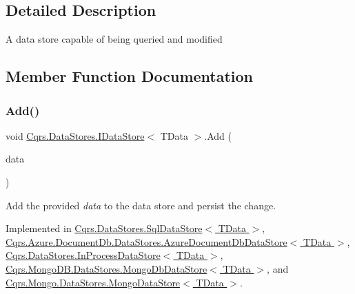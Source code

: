 \subsection{Detailed Description}
A data store capable of being queried and modified 



\subsection{Member Function Documentation}
\mbox{\label{interfaceCqrs_1_1DataStores_1_1IDataStore_a114404daaf37fec9cc5547cd9a17858c_a114404daaf37fec9cc5547cd9a17858c}} 
\subsubsection{\texorpdfstring{Add()}{Add()}\hspace{0.1cm}{\footnotesize\ttfamily [1/2]}}
{\footnotesize\ttfamily void \hyperlink{interfaceCqrs_1_1DataStores_1_1IDataStore}{Cqrs.\+Data\+Stores.\+I\+Data\+Store}$<$ T\+Data $>$.Add (\begin{DoxyParamCaption}\item[{T\+Data}]{data }\end{DoxyParamCaption})}



Add the provided {\itshape data}  to the data store and persist the change. 



Implemented in \hyperlink{classCqrs_1_1DataStores_1_1SqlDataStore_abcca53d2e93dbdfb193a9fb0996849c5_abcca53d2e93dbdfb193a9fb0996849c5}{Cqrs.\+Data\+Stores.\+Sql\+Data\+Store$<$ T\+Data $>$}, \hyperlink{classCqrs_1_1Azure_1_1DocumentDb_1_1DataStores_1_1AzureDocumentDbDataStore_ad17e6e846430e617af24be48b77d1528_ad17e6e846430e617af24be48b77d1528}{Cqrs.\+Azure.\+Document\+Db.\+Data\+Stores.\+Azure\+Document\+Db\+Data\+Store$<$ T\+Data $>$}, \hyperlink{classCqrs_1_1DataStores_1_1InProcessDataStore_ade5c4033c628598665c0cba986a54c15_ade5c4033c628598665c0cba986a54c15}{Cqrs.\+Data\+Stores.\+In\+Process\+Data\+Store$<$ T\+Data $>$}, \hyperlink{classCqrs_1_1MongoDB_1_1DataStores_1_1MongoDbDataStore_affcb1268469b99963501dd8c58e4a480_affcb1268469b99963501dd8c58e4a480}{Cqrs.\+Mongo\+D\+B.\+Data\+Stores.\+Mongo\+Db\+Data\+Store$<$ T\+Data $>$}, and \hyperlink{classCqrs_1_1Mongo_1_1DataStores_1_1MongoDataStore_a27bcfb40fe8203e09d320b2aa19fff3a_a27bcfb40fe8203e09d320b2aa19fff3a}{Cqrs.\+Mongo.\+Data\+Stores.\+Mongo\+Data\+Store$<$ T\+Data $>$}.

